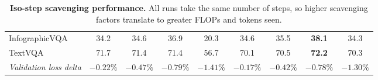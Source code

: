 \documentclass[11pt, a4paper, twocolumn, copyright, google]{google}
\begin{document}
\begin{table}[ht]
\begin{subtable}{\textwidth}
{\begin{tabular}{l cccc cccc}
InfographicVQA  & 34.2 & 34.6 & 36.9 & 20.3 & 34.6 & 35.5 & \textbf{38.1} & 34.3 \\
TextVQA         & 71.7 & 71.4 & 71.4 & 56.7 & 70.1 & 70.5 & \textbf{72.2} & 70.3 \\
\midrule
\textit{Validation loss delta} & $-0.22\%$ & $-0.47\%$ & $-0.79\%$ & $\mathbf{-1.41\%}$ & $-0.17\%$ & $-0.42\%$ & $-0.78\%$ & $-1.30\%$ \\
\bottomrule
\end{tabular}
}
\caption{\textbf{Iso-step scavenging performance.} All runs take the same number of steps, so higher scavenging factors translate to greater FLOPs and tokens seen.}
\label{tab:scavenging_isostep_downstream}
\end{subtable}

\bigskip %
\vspace{1em}


\end{table}
\end{document}
